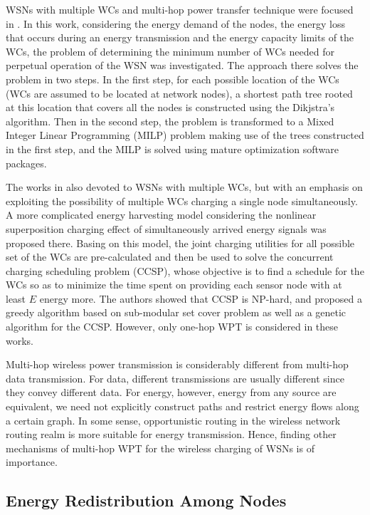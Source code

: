 \documentclass[journal,10pt]{IEEEtran}
\begin{document}
WSNs with multiple WCs and multi-hop power transfer technique were focused in \cite{Rault2013}. In this work, considering the energy demand of the nodes, the energy loss that occurs during an energy transmission and the energy capacity limits of the WCs, the problem of determining the minimum number of WCs needed for perpetual operation of the WSN was investigated. The approach there solves the problem in two steps. In the first step, for each possible location of the WCs (WCs are assumed to be located at network nodes), a shortest path tree rooted at this location that covers all the nodes is constructed using the Dikjstra's algorithm. Then in the second step, the problem is transformed to a Mixed Integer Linear Programming (MILP) problem making use of the trees constructed in the first step, and the MILP is solved using mature optimization software packages.

The works in \cite{Guo2017,Guo2016} also devoted to WSNs with multiple WCs, but with an emphasis on exploiting the possibility of multiple WCs charging a single node simultaneously. A more complicated energy harvesting model considering the nonlinear superposition charging effect of simultaneously arrived energy signals was proposed there. Basing on this model, the joint charging utilities for all possible set of the WCs are pre-calculated and then be used to solve the concurrent charging scheduling problem (CCSP), whose objective is to find a schedule for the WCs so as to minimize the time spent on providing each sensor node with at least $E$ energy more. The authors showed that CCSP is NP-hard, and proposed a greedy algorithm based on sub-modular set cover problem as well as a genetic algorithm for the CCSP. However, only one-hop WPT is considered in these works.

Multi-hop wireless power transmission is considerably different from multi-hop data transmission. For data, different transmissions are usually different since they convey different data. For energy, however, energy from any source are equivalent, we need not explicitly construct paths and restrict energy flows along a certain graph. In some sense, opportunistic routing in the wireless network routing realm is more suitable for energy transmission. Hence, finding other mechanisms of multi-hop WPT for the wireless charging of WSNs is of importance.

\subsection{Energy Redistribution Among Nodes}
\end{document}
